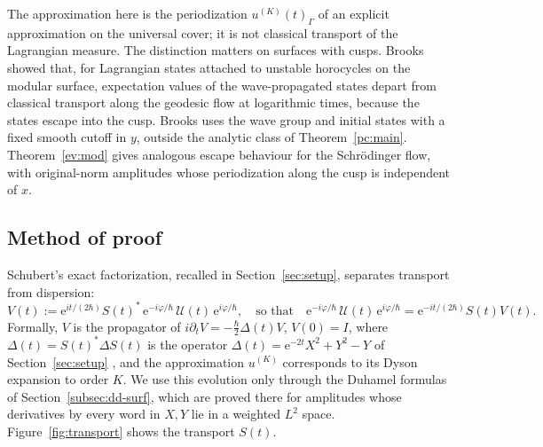\documentclass[twoside,10pt]{article}
\numberwithin{equation}{section}
\theoremstyle{slbody}
\theoremstyle{remark}
\newcommand{\ue}{\mathrm{e}}
\newcommand{\cU}{\mathcal{U}}
\begin{document}
The approximation here is the periodization $u^{(K)}(t)_\Gamma$ of an explicit
approximation on the universal cover; it is not classical transport of the Lagrangian
measure. The distinction matters on surfaces with cusps. Brooks
\cite{Bro22} showed that, for Lagrangian states attached
to unstable horocycles on the modular surface, expectation values of the
wave-propagated states depart from classical transport along the geodesic flow
at logarithmic times, because the states escape into the cusp. Brooks uses the wave group and initial states with a fixed smooth cutoff in $y$,
outside the analytic class of Theorem~\ref{pc:main}. Theorem~\ref{ev:mod} gives analogous escape behaviour for the Schr\"odinger flow, with
original-norm amplitudes whose periodization along the cusp is independent of $x$.

\subsection{Method of proof}\label{subsec:method}
Schubert's exact factorization, recalled in Section~\ref{sec:setup}, separates transport from dispersion:
\begin{equation}\label{eq:factor}
V(t):=\ue^{it/(2\hbar)}S(t)^{*}\,\ue^{-i\varphi/\hbar}\,\cU(t)\,\ue^{i\varphi/\hbar},\quad\text{so that}\quad
\ue^{-i\varphi/\hbar}\,\cU(t)\,\ue^{i\varphi/\hbar}=\ue^{-it/(2\hbar)}S(t)V(t).
\end{equation}
Formally, $V$ is the propagator of $i\partial_tV=-\tfrac{\hbar}{2}\Delta(t)V$, $V(0)=I$, where
$\Delta(t)=S(t)^*\Delta S(t)$ is the operator $\Delta(t)=\ue^{-2t}X^2+Y^2-Y$ of Section~\ref{sec:setup} \cite[Proposition~2.2]{S}, and the approximation
$u^{(K)}$ corresponds to its Dyson expansion to order $K$. We use this evolution only through the Duhamel formulas of
Section~\ref{subsec:dd-surf}, which are proved there for amplitudes whose derivatives by every word in $X,Y$ lie in a
weighted $L^2$ space. Figure~\ref{fig:transport} shows the transport $S(t)$.
\end{document}
